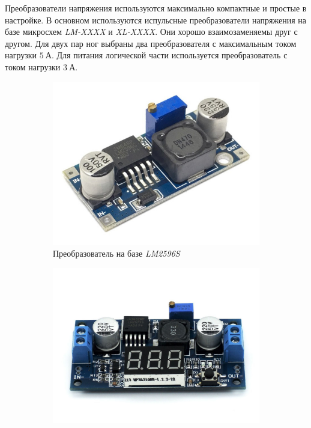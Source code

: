 

Преобразователи напряжения используются максимально компактные и простые в настройке. В основном используются испульсные преобразователи напряжения на базе микросхем \textit{LM-XXXX} и \textit{XL-XXXX}. Они хорошо взаимозаменяемы друг с другом. Для двух пар ног выбраны два преобразователя с максимальным током нагрузки $ 5 \: А $. Для питания логической части используется преобразователь с током нагрузки $ 3 \: А $.
\begin{figure}[ht]
    \centering
    \begin{subfigure}[b]{0.45\textwidth}    
        \centering
        \includegraphics[scale=0.30]{chapter_mechanics_construction/figure4.jpg}
        \caption{Преобразователь на базе \textit{LM2596S}}
    \end{subfigure}
    \begin{subfigure}[b]{0.45\textwidth}
        \centering
        \includegraphics[scale=0.15]{chapter_mechanics_construction/figure5.jpg}

\end{subfigure}
\end{figure}
